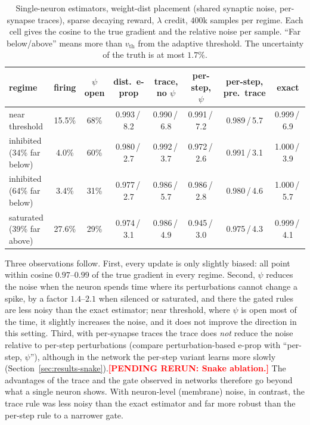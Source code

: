 \documentclass[10pt,twocolumn]{article}
\newcommand{\pending}[1]{\textcolor{red}{\bfseries[PENDING RERUN#1]}}
\newcommand{\method}{perturbation-based e-prop}   %
\begin{document}
\begin{table}[h]
\centering\footnotesize
\begin{tabular}{@{}lccccccc@{}}
\toprule
regime & firing & $\psi$ open & dist.\ e-prop & trace, no $\psi$ & per-step, $\psi$ & per-step, pre.\ trace & exact \\
\midrule
near threshold          & 15.5\% & 68\% & 0.993\,/\,8.2 & 0.990\,/\,6.8 & 0.991\,/\,7.2 & 0.989\,/\,5.7 & 0.999\,/\,6.9 \\
inhibited (34\% far below) & 4.0\% & 60\% & 0.980\,/\,2.7 & 0.992\,/\,3.7 & 0.972\,/\,2.6 & 0.991\,/\,3.1 & 1.000\,/\,3.9 \\
inhibited (64\% far below) & 3.4\% & 31\% & 0.977\,/\,2.7 & 0.986\,/\,5.7 & 0.986\,/\,2.8 & 0.980\,/\,4.6 & 1.000\,/\,5.7 \\
saturated (39\% far above) & 27.6\% & 29\% & 0.974\,/\,3.1 & 0.986\,/\,4.9 & 0.945\,/\,3.0 & 0.975\,/\,4.3 & 0.999\,/\,4.1 \\
\bottomrule
\end{tabular}
\caption{Single-neuron estimators, weight-dist placement (shared synaptic noise,
per-synapse traces), sparse decaying reward, $\lambda$ credit, $400$k samples
per regime. Each cell gives the cosine to the true gradient and the relative
noise per sample. ``Far below/above'' means more than $v_{\mathrm{th}}$ from the
adaptive threshold. The uncertainty of the truth is at most $1.7\%$.}
\label{tab:toy-regimes}
\end{table}

Three observations follow. First, every update is only slightly biased:
all point within cosine $0.97$--$0.99$ of the true gradient in every regime.
Second, $\psi$ reduces the noise when the neuron spends time where its
perturbations cannot change a spike, by a factor $1.4$--$2.1$ when silenced or
saturated, and there the gated rules are less noisy than the exact estimator;
near threshold, where $\psi$ is open most of the time, it slightly increases the
noise, and it does not improve the direction in this setting. Third, with
per-synapse traces the trace does \emph{not} reduce the noise relative to
per-step perturbations (compare \method{} with ``per-step, $\psi$''),
although in the network the per-step variant learns more slowly
(Section~\ref{sec:results-snake}).\pending{: Snake ablation.} The advantages
of the trace and the gate observed in networks therefore go beyond what a
single neuron shows. With neuron-level (membrane) noise, in contrast, the trace
rule was less noisy than the exact estimator and far more robust than the
per-step rule to a narrower gate.
\end{document}
